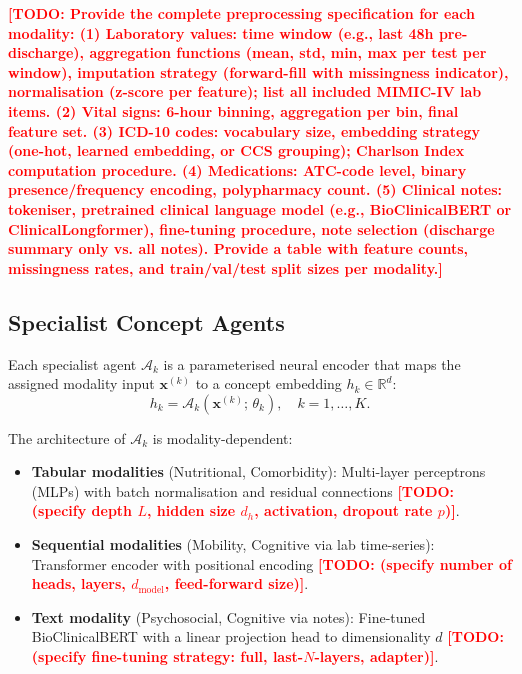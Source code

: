 \documentclass[review,12pt,authoryear]{elsarticle}
\newcommand{\todo}[1]{\textcolor{red}{\textbf{[TODO: #1]}}}
\begin{document}
\todo{Provide the complete preprocessing specification for each modality:
(1) \textbf{Laboratory values}: time window (e.g., last 48h pre-discharge), aggregation functions (mean, std, min, max per test per window), imputation strategy (forward-fill with missingness indicator), normalisation (z-score per feature); list all included MIMIC-IV lab items.
(2) \textbf{Vital signs}: 6-hour binning, aggregation per bin, final feature set.
(3) \textbf{ICD-10 codes}: vocabulary size, embedding strategy (one-hot, learned embedding, or CCS grouping); Charlson Index computation procedure.
(4) \textbf{Medications}: ATC-code level, binary presence/frequency encoding, polypharmacy count.
(5) \textbf{Clinical notes}: tokeniser, pretrained clinical language model (e.g., BioClinicalBERT or ClinicalLongformer), fine-tuning procedure, note selection (discharge summary only vs. all notes).
Provide a table with feature counts, missingness rates, and train/val/test split sizes per modality.}

\subsection{Specialist Concept Agents}
\label{subsec:agents}

Each specialist agent $\mathcal{A}_k$ is a parameterised neural encoder that maps the assigned modality input $\mathbf{x}^{(k)}$ to a concept embedding $h_k \in \mathbb{R}^d$:
\begin{equation}
  h_k = \mathcal{A}_k\!\left(\mathbf{x}^{(k)};\, \theta_k\right), \quad k = 1, \ldots, K.
  \label{eq:agent}
\end{equation}

The architecture of $\mathcal{A}_k$ is modality-dependent:
\begin{itemize}[leftmargin=*, noitemsep]
  \item \textbf{Tabular modalities} (Nutritional, Comorbidity): Multi-layer perceptrons (MLPs) with batch normalisation and residual connections \todo{(specify depth $L$, hidden size $d_h$, activation, dropout rate $p$)}.
  \item \textbf{Sequential modalities} (Mobility, Cognitive via lab time-series): Transformer encoder with positional encoding \todo{(specify number of heads, layers, $d_\text{model}$, feed-forward size)}.
  \item \textbf{Text modality} (Psychosocial, Cognitive via notes): Fine-tuned BioClinicalBERT \citep{alsentzer2019publicly} with a linear projection head to dimensionality $d$ \todo{(specify fine-tuning strategy: full, last-$N$-layers, adapter)}.
\end{itemize}
\end{document}
